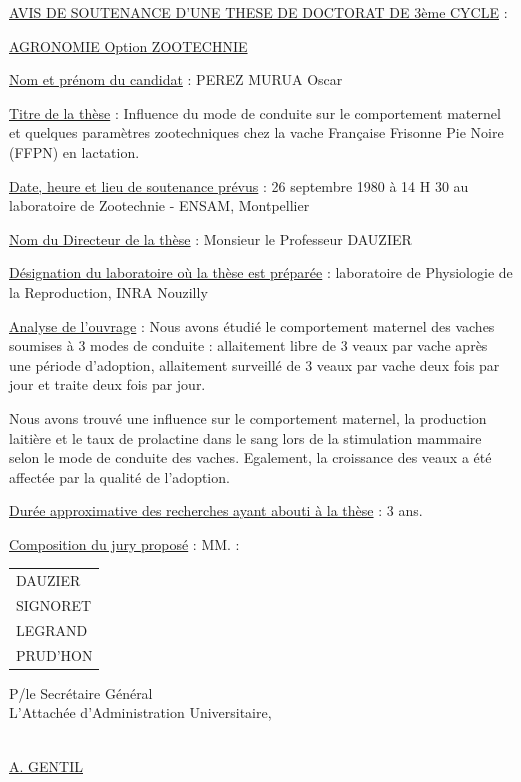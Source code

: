 \begin{center}
\uline{AVIS DE SOUTENANCE D'UNE THESE DE DOCTORAT DE 3ème CYCLE} :

\uline{AGRONOMIE Option ZOOTECHNIE}
\end{center}

\uline{Nom et prénom du candidat} : PEREZ MURUA Oscar

\uline{Titre de la thèse} : Influence du mode de conduite sur le comportement maternel et quelques paramètres zootechniques chez la vache Française Frisonne Pie Noire (FFPN) en lactation.

\uline{Date, heure et lieu de soutenance prévus} : 26 septembre 1980 à 14 H 30 au laboratoire de Zootechnie - ENSAM, Montpellier

\uline{Nom du Directeur de la thèse} : Monsieur le Professeur DAUZIER

\uline{Désignation du laboratoire où la thèse est préparée} : laboratoire de Physiologie de la Reproduction, INRA Nouzilly

\uline{Analyse de l'ouvrage} : Nous avons étudié le comportement maternel des vaches soumises à 3 modes de conduite : allaitement libre de 3 veaux par vache après une période d'adoption, allaitement surveillé de 3 veaux par vache deux fois par jour et traite deux fois par jour.

Nous avons trouvé une influence sur le comportement maternel, la production laitière et le taux de prolactine dans le sang lors de la stimulation mammaire selon le mode de conduite des vaches. Egalement, la croissance des veaux a été affectée par la qualité de l'adoption.

\uline{Durée approximative des recherches ayant abouti à la thèse} : 3 ans.

\uline{Composition du jury proposé} : MM. : \begin{tabular}[t]{l}
DAUZIER\\
SIGNORET\\
LEGRAND\\
PRUD'HON
\end{tabular}

\begin{flushright}
P/le Secrétaire Général\\
L'Attachée d'Administration Universitaire,

\uline{}\\
\uline{A. GENTIL}
\end{flushright}

